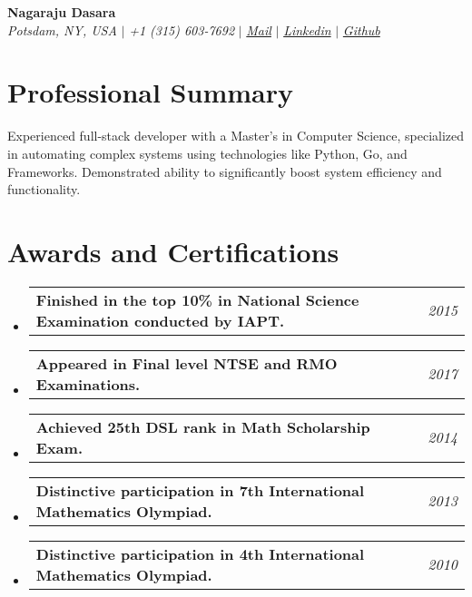 \documentclass[letterpaper,10pt]{article}
\makeatletter
\newcommand{\sectionspace}{
\vspace{-20pt}
}
\newcommand{\subheadingtitlevspace}{
\vspace{-3pt}
}
\newcommand{\titleItem}[1]{
  \textbf{#1}
}
\newcommand{\resumeProjectHeading}[2]{
    \item
    \begin{tabular*}{0.97\textwidth}{l@{\extracolsep{\fill}}r}
      #1 & \textit{ #2} \\
    \end{tabular*}\vspace{-9pt}
}
\newcommand{\resumeSubHeadingListStart}{\subheadingtitlevspace\begin{itemize}[leftmargin=0.15in, label={}]}
\newcommand{\resumeSubHeadingListEnd}{\end{itemize}}
\makeatother
\begin{document}

\begin{flushleft}
    \textbf{\large Nagaraju Dasara} \\    
    \textit{Potsdam, NY, USA} $|$ 
    \textit{+1 (315) 603-7692} $|$  
    \href{mailto:nagarajudasara@gmail.com}{{\textit{Mail}}} $|$ 
    \href{https://www.linkedin.com/in/nagaraj-yadav/}{{\textit{Linkedin}}} $|$
    \href{https://github.com}{{\textit{Github}}}
    \vspace{-8pt}
\end{flushleft}


\section{Professional Summary}
\vspace{-3pt}
\begin{itemize}[leftmargin=0.15in, label={}]
    {\item{
     {Experienced full-stack developer with a Master’s in Computer Science, specialized in automating complex systems using technologies like Python, Go, and Frameworks. Demonstrated ability to significantly boost system efficiency and functionality.} \\      
    }}
 \end{itemize}
 \sectionspace



\section{Awards and Certifications}
    \resumeSubHeadingListStart
      \resumeProjectHeading
          {\titleItem{Finished in the top 10\% in National Science Examination conducted by IAPT.}}{2015}
      \resumeProjectHeading
          {\titleItem{Appeared in Final level NTSE and RMO Examinations.}}{2017}
      \resumeProjectHeading
          {\titleItem{Achieved 25th DSL rank in Math Scholarship Exam.}}{2014}
          \resumeProjectHeading
          {\titleItem{Distinctive participation in 7th International Mathematics Olympiad.}}{2013}
          \resumeProjectHeading
          {\titleItem{Distinctive participation in 4th International Mathematics Olympiad.}}{2010}
    \resumeSubHeadingListEnd
\end{document}
